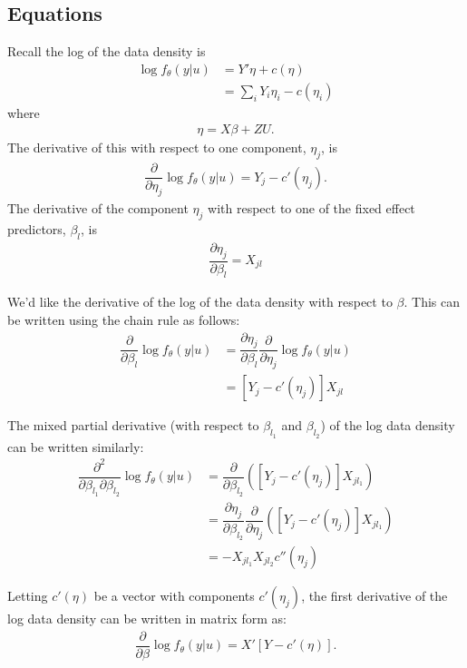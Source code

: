\documentclass{article}
\begin{document}
\subsection{Equations}
Recall the log of the data density is
\begin{align}
\log f_\theta(y|u) &= Y' \eta +c(\eta) \\
&= \sum_{i} Y_{i} {\eta_{i}} - c({\eta_{i}})
\end{align}
where
\begin{align}
\eta=X\beta+ZU.
\end{align}
The derivative of this with respect to one component, $\eta_j$, is
\begin{align}
\dfrac{\partial}{\partial \eta_j} \log f_\theta(y|u)  = Y_j-c'(\eta_j).
\end{align}
The derivative of the component $\eta_j$ with respect to one of the fixed effect predictors, $\beta_{l}$, is
\begin{align}
\dfrac{\partial \eta_j}{\partial \beta_{l}} = X_{j{l}}
\end{align}

We'd like the derivative of the log of the data density with respect to $\beta$. This can be written using the chain rule as follows:
\begin{align}
\dfrac{\partial}{\partial \beta_{l}}  \log f_\theta(y|u) &= \dfrac{\partial \eta_j}{\partial \beta_{l}} \dfrac{\partial}{\partial \eta_j} \log f_\theta(y|u) \\
&= \left[ Y_j-c'(\eta_j) \right]  X_{j{l}}
\end{align}

The mixed partial derivative (with respect to $\beta_{l_1}$ and $\beta_{l_2}$) of the log data density can be written similarly:
\begin{align}
\dfrac{\partial^2}{\partial \beta_{l_1} \partial \beta_{l_2}}  \log f_\theta(y|u) &=\dfrac{\partial}{\partial \beta_{l_2}} \left( \left[ Y_j-c'(\eta_j) \right]  X_{j{l_1}} \right) \\
&= \dfrac{\partial \eta_j}{\partial \beta_{l_2}} \dfrac{\partial}{\partial \eta_j} \left( \left[ Y_j-c'(\eta_j) \right]  X_{j{l_1}} \right) \\
&= -X_{j{l_1}} X_{j{l_2}} c''(\eta_j) 
 \end{align}


Letting $c'(\eta)$ be a vector with components $c'(\eta_j)$, the first derivative of the log data density can be written in matrix form as:
\begin{align}
\dfrac{\partial}{\partial \beta}  \log f_\theta(y|u) = X' \left[ Y-  c'(\eta)  \right].
\end{align}
\end{document}
